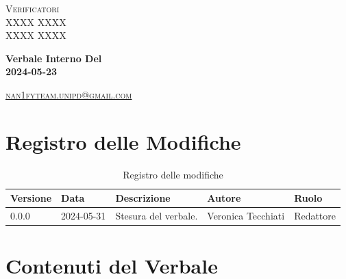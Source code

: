 \documentclass[8pt]{article}
\begin{document}
\begin{titlepage}
\begin{minipage}[t]{0.47\textwidth}
		{\large{\textsc{Verificatori}}
			\vspace{3mm}
			{\\\large{\textsc{XXXX XXXX}\\}} %
			{\large{\textsc{XXXX XXXX}}}
			
		}
		\vspace{4mm}\vspace{4mm}
	\end{minipage}
	\vspace{4cm}
	\begin{center}
		\begin{flushright}
			{\fontsize{30pt}{52pt}\selectfont \textbf{Verbale Interno Del\\2024-05-23\\}} %
		\end{flushright}
		\vspace{3cm}
	\end{center}
	\vspace{8 cm}
	{\small \textsc{\href{mailto: nan1fyteam.unipd@gmail.com}{nan1fyteam.unipd@gmail.com}}}
\end{titlepage}
\pagestyle{mystyle}
\section*{Registro delle Modifiche}
\begin{table}[ht!]	
	\centering
	\begin{tabular}{p{1.2cm} p{2cm} p{6cm} p{3cm} p{2cm}}
		\toprule
		\textbf{Versione}& \textbf{Data} & \textbf{Descrizione} & \textbf{Autore} & \textbf{Ruolo} \\
		\midrule
		0.0.0 & 2024-05-31 & Stesura del verbale. & Veronica Tecchiati & Redattore \\
		\bottomrule
	\end{tabular}
	\caption{Registro delle modifiche}
	\label{table:Registro delle modifiche}
\end{table}
\newpage
\tableofcontents
\clearpage
\newpage
\justifying
\section{Contenuti del Verbale}
\end{document}
